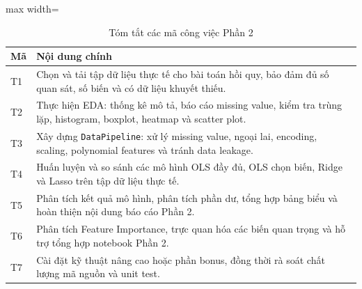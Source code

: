 \begin{table}[H]
\centering
\caption{Tóm tắt các mã công việc Phần 2}
\label{tab:assignment_t_summary}
\begin{adjustbox}{max width=\textwidth}
\begin{tabular}{|p{}|p{}|}
\hline
\textbf{Mã} & \textbf{Nội dung chính} \\ \hline
T1 & Chọn và tải tập dữ liệu thực tế cho bài toán hồi quy, bảo đảm đủ số quan sát, số biến và có dữ liệu khuyết thiếu. \\ \hline
T2 & Thực hiện EDA: thống kê mô tả, báo cáo missing value, kiểm tra trùng lặp, histogram, boxplot, heatmap và scatter plot. \\ \hline
T3 & Xây dựng \texttt{DataPipeline}: xử lý missing value, ngoại lai, encoding, scaling, polynomial features và tránh data leakage. \\ \hline
T4 & Huấn luyện và so sánh các mô hình OLS đầy đủ, OLS chọn biến, Ridge và Lasso trên tập dữ liệu thực tế. \\ \hline
T5 & Phân tích kết quả mô hình, phân tích phần dư, tổng hợp bảng biểu và hoàn thiện nội dung báo cáo Phần 2. \\ \hline
T6 & Phân tích Feature Importance, trực quan hóa các biến quan trọng và hỗ trợ tổng hợp notebook Phần 2. \\ \hline
T7 & Cài đặt kỹ thuật nâng cao hoặc phần bonus, đồng thời rà soát chất lượng mã nguồn và unit test. \\ \hline
\end{tabular}
\end{adjustbox}
\end{table}
\endgroup

